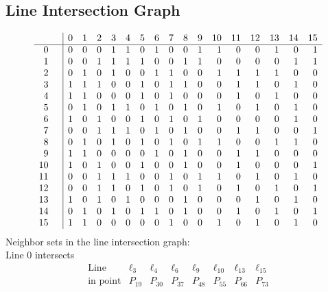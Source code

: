 \documentclass{article}
\begin{document}
{\subsection*{Line Intersection Graph}
{\arraycolsep=1pt
$$
\begin{array}{rr|*{16}r}
 &  & 0 & 1 & 2 & 3 & 4 & 5 & 6 & 7 & 8 & 9 & 10 & 11 & 12 & 13 & 14 & 15\\
\hline
0 &  & 0 & 0 & 0 & 1 & 1 & 0 & 1 & 0 & 0 & 1 & 1 & 0 & 0 & 1 & 0 & 1\\
1 &  & 0 & 0 & 1 & 1 & 1 & 1 & 0 & 0 & 1 & 1 & 0 & 0 & 0 & 0 & 1 & 1\\
2 &  & 0 & 1 & 0 & 1 & 0 & 0 & 1 & 1 & 0 & 0 & 1 & 1 & 1 & 1 & 0 & 0\\
3 &  & 1 & 1 & 1 & 0 & 0 & 1 & 0 & 1 & 1 & 0 & 0 & 1 & 1 & 0 & 1 & 0\\
4 &  & 1 & 1 & 0 & 0 & 0 & 1 & 0 & 1 & 0 & 0 & 0 & 1 & 0 & 1 & 0 & 0\\
5 &  & 0 & 1 & 0 & 1 & 1 & 0 & 1 & 0 & 1 & 0 & 1 & 0 & 1 & 0 & 1 & 0\\
6 &  & 1 & 0 & 1 & 0 & 0 & 1 & 0 & 1 & 0 & 1 & 0 & 0 & 0 & 0 & 1 & 0\\
7 &  & 0 & 0 & 1 & 1 & 1 & 0 & 1 & 0 & 1 & 0 & 0 & 1 & 1 & 0 & 0 & 1\\
8 &  & 0 & 1 & 0 & 1 & 0 & 1 & 0 & 1 & 0 & 1 & 1 & 0 & 0 & 1 & 1 & 0\\
9 &  & 1 & 1 & 0 & 0 & 0 & 0 & 1 & 0 & 1 & 0 & 0 & 1 & 1 & 0 & 0 & 0\\
10 &  & 1 & 0 & 1 & 0 & 0 & 1 & 0 & 0 & 1 & 0 & 0 & 1 & 0 & 0 & 0 & 1\\
11 &  & 0 & 0 & 1 & 1 & 1 & 0 & 0 & 1 & 0 & 1 & 1 & 0 & 1 & 0 & 1 & 0\\
12 &  & 0 & 0 & 1 & 1 & 0 & 1 & 0 & 1 & 0 & 1 & 0 & 1 & 0 & 1 & 0 & 1\\
13 &  & 1 & 0 & 1 & 0 & 1 & 0 & 0 & 0 & 1 & 0 & 0 & 0 & 1 & 0 & 1 & 0\\
14 &  & 0 & 1 & 0 & 1 & 0 & 1 & 1 & 0 & 1 & 0 & 0 & 1 & 0 & 1 & 0 & 1\\
15 &  & 1 & 1 & 0 & 0 & 0 & 0 & 0 & 1 & 0 & 0 & 1 & 0 & 1 & 0 & 1 & 0\\
\end{array}
$$
}%
Neighbor sets in the line intersection graph:\\
Line 0 intersects 
$$
\begin{array}{|r*{7}{|c}|}
\hline
\mbox{Line}  & \ell_{3} & \ell_{4} & \ell_{6} & \ell_{9} & \ell_{10} & \ell_{13} & \ell_{15}\\
\hline
\mbox{in point}  & P_{19} & P_{30} & P_{37} & P_{48} & P_{55} & P_{66} & P_{73}\\

\end{array}$$}
\end{document}
